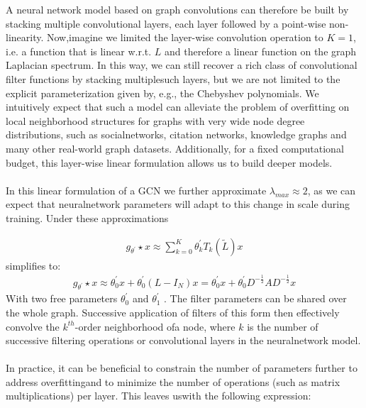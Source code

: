 \documentclass[12pt,a4paper]{article}
\begin{document}
A neural network model based on graph convolutions can therefore be built by stacking multiple convolutional layers, each layer followed by a point-wise non-linearity.  Now,imagine we limited the layer-wise convolution operation to $K= 1$, i.e. a function that is linear w.r.t. $L$ and therefore a linear function on the graph Laplacian spectrum. In this way, we can still recover a rich class of convolutional filter functions by stacking multiplesuch layers, but we are not limited to the explicit parameterization given by, e.g., the Chebyshev polynomials.  We intuitively expect that such a model can alleviate the problem of overfitting on local neighborhood structures for graphs with very wide node degree distributions, such as socialnetworks, citation networks, knowledge graphs and many other real-world graph datasets. Additionally, for a fixed computational budget, this layer-wise linear formulation allows us to build deeper models.
\\ \\
In this linear formulation of a GCN we further approximate $\lambda_{max} \approx 2$, as we can expect that neuralnetwork parameters will adapt to this change in scale during training.  Under these approximations

\begin{align*}
g_{\theta^{'}} \star x \approx \sum_{k=0}^{K} \theta_{k}^{'} T_{k} ( \tilde{ L } )x
\end{align*}
simplifies to:
\begin{align*}
g_{\theta^{'}} \star x \approx \theta_{0}^{'}x+\theta_{0}^{'}(L-I_{N})x = \theta_{0}^{'}x+\theta_{0}^{'} D^{-\frac{1}{2}}AD^{-\frac{1}{2}}x
\end{align*}
With two  free  parameters $\theta_{0}^{'}$ and $\theta_{1}^{'}$ .   The filter parameters  can  be shared over  the whole graph. Successive application of filters of this form then effectively convolve the $k^{th}$-order neighborhood ofa node, where $k$ is the number of successive filtering operations or convolutional layers in the neuralnetwork model.
\\ \\
In practice, it can be beneficial to constrain the number of parameters further to address overfittingand to minimize the number of operations (such as matrix multiplications) per layer. This leaves uswith the following expression:
\end{document}
